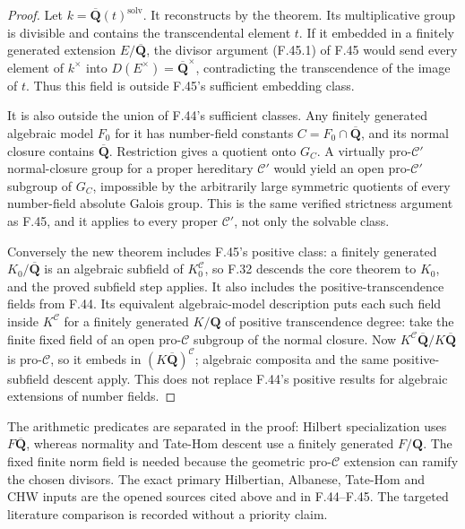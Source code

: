\begin{proof}

Let \(k=\overline{\mathbf Q}(t)^{\mathrm{solv}}\). It reconstructs by
the theorem. Its multiplicative group is divisible and contains the
transcendental element \(t\). If it embedded in a finitely generated
extension \(E/\overline{\mathbf Q}\), the divisor argument \textup{(F.45.1)} of
F.45 would send every element of \(k^\times\) into
\(D(E^\times)=\overline{\mathbf Q}^\times\), contradicting the
transcendence of the image of \(t\). Thus this field is outside F.45's
sufficient embedding class.

It is also outside the union of F.44's sufficient classes. Any
finitely generated algebraic model \(F_0\) for it has number-field
constants \(C=F_0\cap\overline{\mathbf Q}\), and its normal closure
contains \(\overline{\mathbf Q}\). Restriction gives a quotient onto
\(G_C\). A virtually pro-\(\mathcal C'\) normal-closure group for a
proper hereditary \(\mathcal C'\) would yield an open pro-\(\mathcal C'\)
subgroup of \(G_C\), impossible by the arbitrarily large symmetric
quotients of every number-field absolute Galois group. This is the
same verified strictness argument as F.45, and it applies to every
proper \(\mathcal C'\), not only the solvable class.

Conversely the new theorem includes F.45's positive class: a finitely
generated \(K_0/\overline{\mathbf Q}\) is an algebraic subfield of
\(K_0^{\mathcal C}\), so F.32 descends the core theorem to \(K_0\),
and the proved subfield step applies. It also includes the
positive-transcendence fields from F.44. Its equivalent algebraic-model
description puts each such field inside \(K^{\mathcal C}\) for a
finitely generated \(K/\mathbf Q\) of positive transcendence degree:
take the finite fixed field of an open pro-\(\mathcal C\) subgroup of
the normal closure. Now
\(K^{\mathcal C}\overline{\mathbf Q}/K\overline{\mathbf Q}\) is
pro-\(\mathcal C\), so it embeds in
\((K\overline{\mathbf Q})^{\mathcal C}\); algebraic composita and
the same positive-subfield descent apply. This does not replace F.44's
positive results for algebraic extensions of number fields.


\end{proof}

The arithmetic predicates are separated in the proof: Hilbert
specialization uses $F\overline{\mathbf Q}$, whereas normality and
Tate-Hom descent use a finitely generated $F/\mathbf Q$.
The fixed finite norm field is needed because the geometric
pro-$\mathcal C$ extension can ramify the chosen divisors.
The exact primary Hilbertian, Albanese, Tate-Hom and CHW inputs are
the opened sources cited above and in F.44--F.45. The targeted
literature comparison is recorded without a priority claim.
